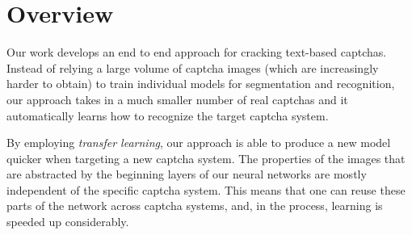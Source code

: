 \section{Overview}
Our work develops an end to end approach for cracking text-based captchas. Instead of relying a large volume of captcha images (which are
increasingly harder to obtain) to train individual models for segmentation and recognition, our approach takes in a much smaller number of
real captchas and it automatically learns how to recognize the target captcha system.  


By employing \emph{transfer learning}, our approach is able to produce a new model quicker when targeting a new captcha system. The
properties of the images that are abstracted by the beginning layers of our neural networks are mostly independent of the specific captcha
system. This means that one can reuse these parts of the network across captcha systems, and, in the process, learning is speeded up
considerably.



